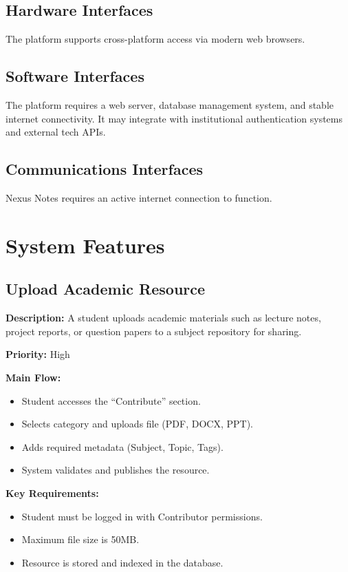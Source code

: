 \documentclass[12pt]{article}
\begin{document}
\subsection{Hardware Interfaces}
The platform supports cross-platform access via modern web browsers.

\subsection{Software Interfaces}
The platform requires a web server, database management system, and stable internet connectivity.
It may integrate with institutional authentication systems and external tech APIs.

\subsection{Communications Interfaces}
Nexus Notes requires an active internet connection to function.

\section{System Features}

\subsection{Upload Academic Resource}

\textbf{Description:} A student uploads academic materials such as lecture notes, project reports, or question papers to a subject repository for sharing.

\textbf{Priority:} High

\textbf{Main Flow:}
\begin{itemize}
    \item Student accesses the ``Contribute'' section.
    \item Selects category and uploads file (PDF, DOCX, PPT).
    \item Adds required metadata (Subject, Topic, Tags).
    \item System validates and publishes the resource.
\end{itemize}

\textbf{Key Requirements:}
\begin{itemize}
    \item Student must be logged in with Contributor permissions.
    \item Maximum file size is 50MB.
    \item Resource is stored and indexed in the database.
\end{itemize}
\end{document}
